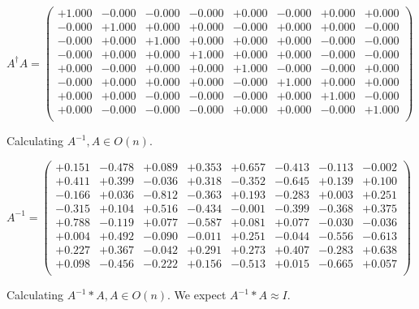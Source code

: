 \documentclass[9pt]{article}
\theoremstyle{plain}
\theoremstyle{definition}
\theoremstyle{remark}
\numberwithin{equation}{section}
\begin{document}
$A^{\dag} A = \left(
\begin{array}{
cccccccc}
+1.000 & -0.000 & -0.000 & -0.000 & +0.000 & -0.000 & +0.000 & +0.000 \\
-0.000 & +1.000 & +0.000 & +0.000 & -0.000 & +0.000 & +0.000 & -0.000 \\
-0.000 & +0.000 & +1.000 & +0.000 & +0.000 & +0.000 & -0.000 & -0.000 \\
-0.000 & +0.000 & +0.000 & +1.000 & +0.000 & +0.000 & -0.000 & -0.000 \\
+0.000 & -0.000 & +0.000 & +0.000 & +1.000 & -0.000 & -0.000 & +0.000 \\
-0.000 & +0.000 & +0.000 & +0.000 & -0.000 & +1.000 & +0.000 & +0.000 \\
+0.000 & +0.000 & -0.000 & -0.000 & -0.000 & +0.000 & +1.000 & -0.000 \\
+0.000 & -0.000 & -0.000 & -0.000 & +0.000 & +0.000 & -0.000 & +1.000 \\
\end{array}
\right)$ \newline 

Calculating $A^{-1} ,  A \in O(n)$.

$A^{-1} = \left(
\begin{array}{
cccccccc}
+0.151 & -0.478 & +0.089 & +0.353 & +0.657 & -0.413 & -0.113 & -0.002 \\
+0.411 & +0.399 & -0.036 & +0.318 & -0.352 & -0.645 & +0.139 & +0.100 \\
-0.166 & +0.036 & -0.812 & -0.363 & +0.193 & -0.283 & +0.003 & +0.251 \\
-0.315 & +0.104 & +0.516 & -0.434 & -0.001 & -0.399 & -0.368 & +0.375 \\
+0.788 & -0.119 & +0.077 & -0.587 & +0.081 & +0.077 & -0.030 & -0.036 \\
+0.004 & +0.492 & -0.090 & -0.011 & +0.251 & -0.044 & -0.556 & -0.613 \\
+0.227 & +0.367 & -0.042 & +0.291 & +0.273 & +0.407 & -0.283 & +0.638 \\
+0.098 & -0.456 & -0.222 & +0.156 & -0.513 & +0.015 & -0.665 & +0.057 \\
\end{array}
\right)$ \newline 

Calculating $A^{-1} *A  ,  A \in O(n)$.   We expect $A^{-1} *A  \approx I$. 
\end{document}
